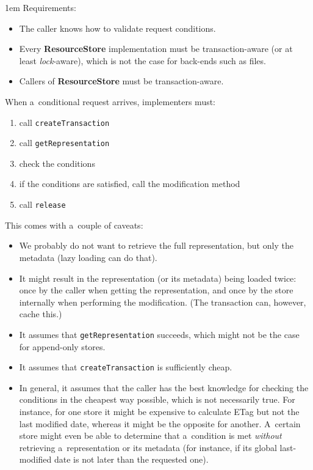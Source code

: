 \documentclass[10pt]{article}
\newenvironment{Note}
  {\begin{multicols}{3}%
     \parskip 1em}
  {\end{multicols}}
\begin{document}
\begin{Note}
Requirements:
\begin{itemize}
  \item The caller knows how to validate request conditions.

  \item Every \textbf{ResourceStore} implementation must be transaction-aware
        (or at least \emph{lock}-aware),
        which is not the case for back-ends such as files.

  \item Callers of \textbf{ResourceStore} must be transaction-aware.
\end{itemize}

\bigskip
When a~conditional request arrives, implementers must:
\begin{enumerate}
  \item call \verb!createTransaction!
  \item call \verb!getRepresentation!
  \item check the conditions
  \item if the conditions are satisfied, call the modification method
  \item call \verb!release!
\end{enumerate}

\bigskip
This comes with a~couple of caveats:
\begin{itemize}
  \item We probably do not want to retrieve the full representation,
        but only the metadata (lazy loading can do that).

  \item It might result in the representation (or its metadata)
        being loaded twice:
        once by the caller when getting the representation,
        and once by the store internally when performing the modification.
        (The transaction can, however, cache this.)

  \item It assumes that \verb!getRepresentation! succeeds,
        which might not be the case for append-only stores.

  \item It assumes that \verb!createTransaction! is sufficiently cheap.

  \item In general,
        it assumes that the caller has the best knowledge
        for checking the conditions in the cheapest way possible,
        which is not necessarily true.
        For instance,
        for one store it might be expensive to calculate ETag
        but not the last modified date,
        whereas it might be the opposite for another.
        A~certain store might even be able to determine
        that a~condition is met \emph{without} retrieving
        a~representation or its metadata
        (for instance, if its global last-modified date
         is not later than the requested one).
\end{itemize}

\columnbreak
\null


\columnbreak
\null

\end{Note}
\end{document}
